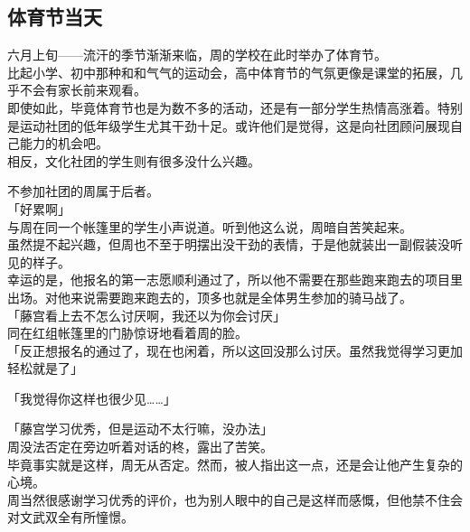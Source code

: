 \subsection{体育节当天}

六月上旬——流汗的季节渐渐来临，周的学校在此时举办了体育节。\\

比起小学、初中那种和和气气的运动会，高中体育节的气氛更像是课堂的拓展，几乎不会有家长前来观看。\\

即使如此，毕竟体育节也是为数不多的活动，还是有一部分学生热情高涨着。特别是运动社团的低年级学生尤其干劲十足。或许他们是觉得，这是向社团顾问展现自己能力的机会吧。\\

相反，文化社团的学生则有很多没什么兴趣。

不参加社团的周属于后者。\\

「好累啊」\\

与周在同一个帐篷里的学生小声说道。听到他这么说，周暗自苦笑起来。\\

虽然提不起兴趣，但周也不至于明摆出没干劲的表情，于是他就装出一副假装没听见的样子。\\

幸运的是，他报名的第一志愿顺利通过了，所以他不需要在那些跑来跑去的项目里出场。对他来说需要跑来跑去的，顶多也就是全体男生参加的骑马战了。\\

「藤宫看上去不怎么讨厌啊，我还以为你会讨厌」\\

同在红组帐篷里的门胁惊讶地看着周的脸。\\

「反正想报名的通过了，现在也闲着，所以这回没那么讨厌。虽然我觉得学习更加轻松就是了」

「我觉得你这样也很少见……」

「藤宫学习优秀，但是运动不太行嘛，没办法」\\

周没法否定在旁边听着对话的柊，露出了苦笑。\\

毕竟事实就是这样，周无从否定。然而，被人指出这一点，还是会让他产生复杂的心境。\\

周当然很感谢学习优秀的评价，也为别人眼中的自己是这样而感慨，但他禁不住会对文武双全有所憧憬。\\

